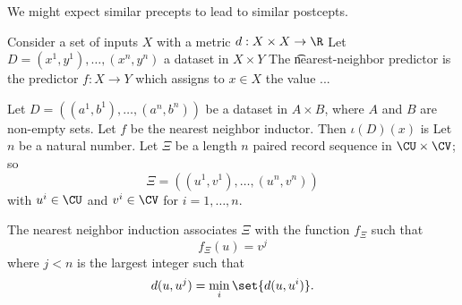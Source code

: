 
We might expect similar precepts to lead to similar postcepts.

Consider a set of inputs $X$ with a metric $d: X \times X \to \R$
Let $D = (x^1, y^1), \dots, (x^n, y^n)$ a dataset in $X \times Y$
The \t{nearest-neighbor predictor} is the predictor $f: X \to Y$ which assigns to $x \in X$ the value ...

Let $D = ((a^1, b^1), \dots, (a^n, b^n))$ be a dataset in $A \times B$, where $A$ and $B$ are non-empty sets.
Let $f$ be the nearest neighbor inductor.
Then $\iota(D)(x)$ is
Let $n$ be a natural number.
Let $\Xi$ be a length $n$ paired record sequence in $\CU \times \CV$; so
  \[
\Xi = ((u^1, v^1), \dots, (u^n, v^n))
  \]
with $u^i \in \CU$ and $v^i \in \CV$ for $i = 1,\dots,n$.

The nearest neighbor induction associates
$\Xi$ with the function $f_{\Xi}$ such that
  \[
f_{\Xi}(u) = v^j
  \]
where $j < n$ is the largest integer such that
  \[
d(u, u^j) = \min_{i} \set{d(u, u^i)}.
  \]

\blankpage
